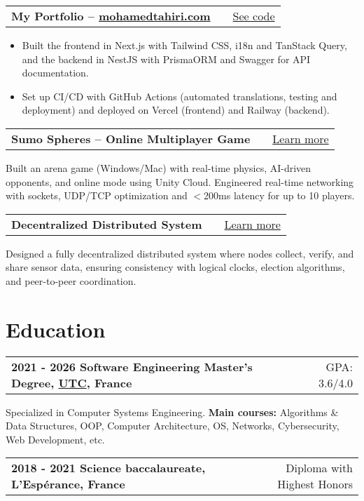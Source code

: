 \documentclass[a4paper,10pt]{article}
\makeatletter
\newenvironment{jobshort}[2]
    {
    \begin{tabularx}{\linewidth}{@{}l X r@{}}
    \textbf{#1} & \hfill &  #2 \\[3.75pt]
    \end{tabularx}
    } {}
\newenvironment{joblong}[2]
    {
    \begin{tabularx}{\linewidth}{@{}l X r@{}}
    \textbf{#1} & \hfill &  #2 \\[3.75pt]
    \end{tabularx}
    \begin{minipage}[t]{\linewidth}
    \begin{itemize}[nosep,after=\strut, leftmargin=1em, itemsep=3pt,label=--]
    }
    {
    \end{itemize}
    \end{minipage}    
    }
\makeatother
\begin{document}
\begin{joblong}{My Portfolio – \href{https://mohamedtahiri.com}{mohamedtahiri.com}}{\href{https://github.com/moha-tah/portfolio}{See code}}
    \item Built the frontend in Next.js with Tailwind CSS, i18n and TanStack Query, and the backend in NestJS with PrismaORM and Swagger for API documentation.
    \item Set up CI/CD with GitHub Actions (automated translations, testing and deployment) and deployed on Vercel (frontend) and Railway (backend).
\end{joblong}

\begin{jobshort}{Sumo Spheres – Online Multiplayer Game}{\href{https://mohamedtahiri.com/projects/online-multiplayer-game}{Learn more}}
    Built an arena game (Windows/Mac) with real-time physics, AI-driven opponents, and online mode using Unity Cloud. Engineered real-time networking with sockets, UDP/TCP optimization and $<$200ms latency for up to 10 players.
\end{jobshort}

\begin{jobshort}{Decentralized Distributed System}{\href{https://mohamedtahiri.com/projects/decentralized-distributed-system}{Learn more}}
    Designed a fully decentralized distributed system where nodes collect, verify, and share sensor data, ensuring consistency with logical clocks, election algorithms, and peer-to-peer coordination.
\end{jobshort}

\section{Education}

\begin{jobshort}{2021 - 2026    Software Engineering Master's Degree, \href{https://www.utc.fr}{UTC}, France}{GPA: 3.6/4.0}
    Specialized in Computer Systems Engineering. \textbf{Main courses:} Algorithms \& Data Structures, OOP, Computer Architecture, OS, Networks, Cybersecurity, Web Development, etc.
\end{jobshort}

\begin{jobshort}{2018 - 2021    Science baccalaureate, L'Espérance, France}{Diploma with Highest Honors}
\end{jobshort}
\end{document}

